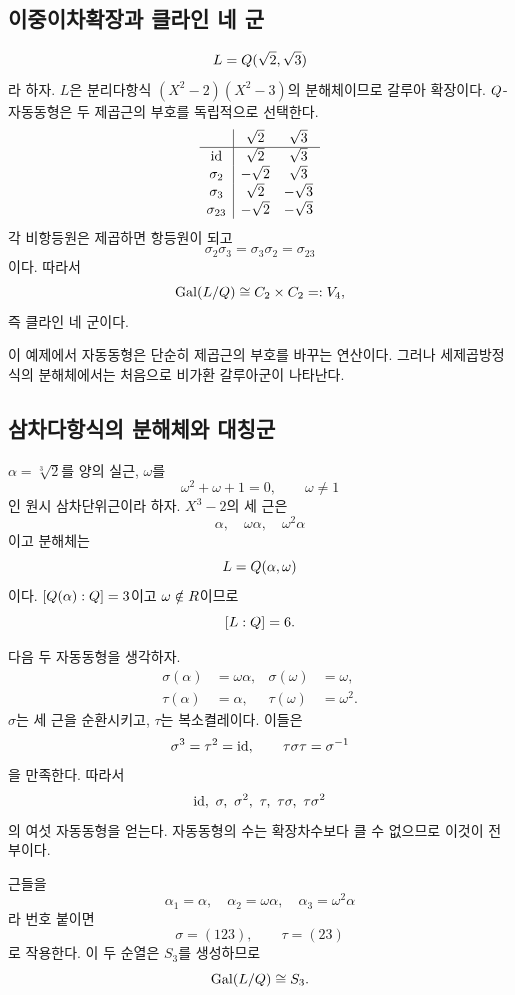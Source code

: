 \subsection{이중이차확장과 클라인 네 군}

\begin{example}
\[
  L=Q(\sqrt2,\sqrt3)
\]
라 하자. $L$은 분리다항식 $(X^2-2)(X^2-3)$의 분해체이므로 갈루아 확장이다. $Q$-자동동형은 두 제곱근의 부호를 독립적으로 선택한다.
\[
\begin{array}{c|cc}
 & \sqrt2 & \sqrt3\\
\hline
\operatorname{id} & \sqrt2 & \sqrt3\\
\sigma_2 & -\sqrt2 & \sqrt3\\
\sigma_3 & \sqrt2 & -\sqrt3\\
\sigma_{23} & -\sqrt2 & -\sqrt3
\end{array}
\]
각 비항등원은 제곱하면 항등원이 되고
\[
  \sigma_2\sigma_3=\sigma_3\sigma_2=\sigma_{23}
\]
이다. 따라서
\[
  \operatorname{Gal}(L/Q)\cong C_2\times C_2=:V_4,
\]
즉 클라인 네 군이다.
\end{example}

이 예제에서 자동동형은 단순히 제곱근의 부호를 바꾸는 연산이다. 그러나 세제곱방정식의 분해체에서는 처음으로 비가환 갈루아군이 나타난다.

\subsection{삼차다항식의 분해체와 대칭군}

\begin{example}
$\alpha=\sqrt[3]{2}$를 양의 실근, $\omega$를
\[
  \omega^2+\omega+1=0,
  \qquad \omega\ne1
\]
인 원시 삼차단위근이라 하자. $X^3-2$의 세 근은
\[
  \alpha,\quad\omega\alpha,\quad\omega^2\alpha
\]
이고 분해체는
\[
  L=Q(\alpha,\omega)
\]
이다. $[Q(\alpha):Q]=3$이고 $\omega\notin R$이므로
\[
  [L:Q]=6.
\]

다음 두 자동동형을 생각하자.
\[
\begin{aligned}
  \sigma(\alpha)&=\omega\alpha,
  &\sigma(\omega)&=\omega,\\
  \tau(\alpha)&=\alpha,
  &\tau(\omega)&=\omega^2.
\end{aligned}
\]
$\sigma$는 세 근을 순환시키고, $\tau$는 복소켤레이다. 이들은
\[
  \sigma^3=\tau^2=\operatorname{id},
  \qquad
  \tau\sigma\tau=\sigma^{-1}
\]
을 만족한다. 따라서
\[
  \id,\ \sigma,\ \sigma^2,\ \tau,\ \tau\sigma,\ \tau\sigma^2
\]
의 여섯 자동동형을 얻는다. 자동동형의 수는 확장차수보다 클 수 없으므로 이것이 전부이다.

근들을
\[
  \alpha_1=\alpha,
  \quad \alpha_2=\omega\alpha,
  \quad \alpha_3=\omega^2\alpha
\]
라 번호 붙이면
\[
  \sigma=(123),
  \qquad
  \tau=(23)
\]
로 작용한다. 이 두 순열은 $S_3$를 생성하므로
\[
  \operatorname{Gal}(L/Q)\cong S_3.
\]
\end{example}

